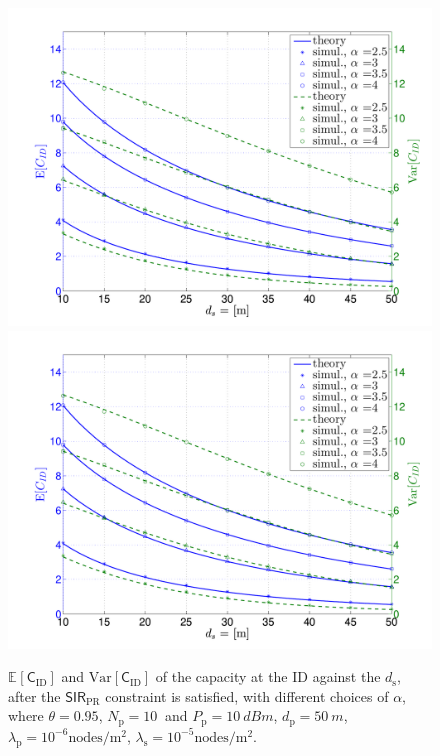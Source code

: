 \documentclass[conference, twocolumn]{IEEEtran}
\newcommand{\e}[2]{{\mathbb E}_{#1}\left[ #2 \right]}
\newcommand{\sub}[1]{_{\text{#1}}}
\newtheorem{remark}{Remark}
\begin{document}
\begin{figure}[!t]
        \centering
	\makeatletter
	\if@twocolumn
        	\includegraphics[trim=1.0cm 0.5cm 0.7cm 1.4cm,clip=true,width= \columnwidth]{figures/fig_ID_Cap_Moments_vs_d_s_1e5}
	\else
        	\includegraphics[trim=0.0cm 0.0cm 0.0cm 0.0cm,clip=true,width=0.5 \columnwidth]{figures/fig_ID_Cap_Moments_vs_d_s_1e5}
	\fi
	\makeatother
\caption{$\e{}{\mathsf{C}\sub{ID}}$ and $\text{Var} [\mathsf{C}_{\text{ID}} ]$ of the capacity at the ID against the $d\sub{s}$, after the $\textsf{SIR}\sub{PR}$ constraint is satisfied, with different choices of $\alpha$, where $\theta = 0.95$, $N\sub{p} = \SI{10}{}$ and $P\sub{p} = \SI{10}{dBm}$, $d\sub{p}=\SI{50}{m}$, $\lambda\sub{p} = 10^{-6} \text{nodes}/{\text{m}^2}$, $\lambda\sub{s} = 10^{-5} \text{nodes}/{\text{m}}^2$.}
\label{fig:Cap_Moments}
\end{figure}
\end{document}

